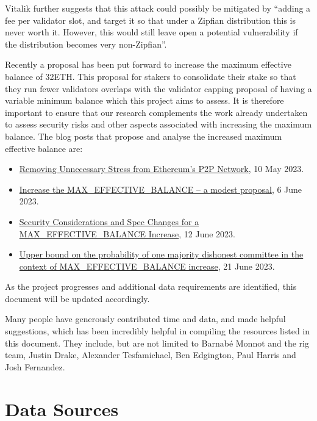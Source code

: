 \documentclass[UTF8]{article}
\begin{document}
Vitalik further suggests that this attack could possibly be mitigated by ``adding a fee per validator slot, and target it so that under a Zipfian distribution this is never worth it. However, this would still leave open a potential vulnerability if the distribution becomes very non-Zipfian''. 

Recently a proposal has been put forward to increase the maximum effective balance of 32ETH. This proposal for stakers to consolidate their stake so that they run fewer validators overlaps with the validator capping proposal of having a variable minimum balance which this project aims to assess. It is therefore important to ensure that our research complements the work already undertaken to assess security risks and other aspects associated with increasing the maximum balance. The blog posts that propose and analyse the increased maximum effective balance are:
\begin{itemize}
\item \href{https://ethresear.ch/t/removing-unnecessary-stress-from-ethereums-p2p-network/15547}{Removing Unnecessary Stress from Ethereum’s P2P Network}, 10 May 2023.
\item \href{https://ethresear.ch/t/increase-the-max-effective-balance-a-modest-proposal/15801/3}{Increase the MAX\_EFFECTIVE\_BALANCE – a modest proposal}, 6 June 2023.
\item \href{https://notes.ethereum.org/nHqON5l7SACkL_nPwz8Vqw}{Security Considerations and Spec Changes for a MAX\_EFFECTIVE\_BALANCE Increase}, 12 June 2023.
\item \href{https://hackmd.io/@0g8QuqEeQBe45CC8toURGw/HylpAVzIH2}{Upper bound on the probability of one majority dishonest committee in the context of MAX\_EFFECTIVE\_BALANCE increase}, 21 June 2023.
\end{itemize}


As the project progresses and additional data requirements are identified, this document will be updated accordingly.

Many people have generously contributed time and data, and made helpful suggestions, which has been incredibly helpful in compiling the resources listed in this document. They include, but are not limited to Barnabé Monnot and the \gls{rig} team, Justin Drake, Alexander Tesfamichael, Ben Edgington, Paul Harris and Josh Fernandez.

\section{Data Sources}
\label{sec:sources}
\end{document}
